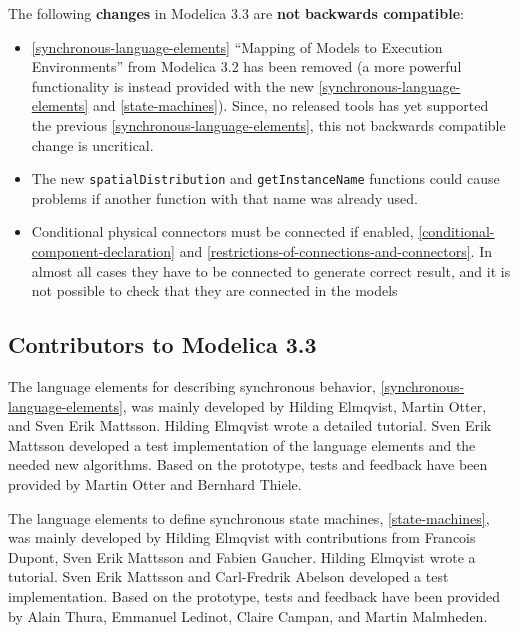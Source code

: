 The following \textbf{changes} in Modelica 3.3 are \textbf{not}
\textbf{backwards compatible}:

\begin{itemize}
\item
  \autoref{synchronous-language-elements} ``Mapping of Models to Execution Environments'' from
  Modelica 3.2 has been removed (a more powerful functionality is
  instead provided with the new \autoref{synchronous-language-elements} and \autoref{state-machines}). Since, no
  released tools has yet supported the previous \autoref{synchronous-language-elements}, this not
  backwards compatible change is uncritical.
\item
  The new \lstinline!spatialDistribution! and \lstinline!getInstanceName! functions could cause
  problems if another function with that name was already used.
\end{itemize}

\begin{itemize}
\item
  Conditional physical connectors must be connected if enabled,
  \autoref{conditional-component-declaration}
  and \autoref{restrictions-of-connections-and-connectors}. In almost all cases they have to be connected
  to generate correct result, and it is not possible to check that they
  are connected in the models
\end{itemize}

\subsection{Contributors to Modelica 3.3}

The language elements for describing synchronous behavior, \autoref{synchronous-language-elements},
was mainly developed by Hilding Elmqvist, Martin Otter, and Sven Erik
Mattsson. Hilding Elmqvist wrote a detailed tutorial. Sven Erik Mattsson
developed a test implementation of the language elements and the needed
new algorithms. Based on the prototype, tests and feedback have been
provided by Martin Otter and Bernhard Thiele.

The language elements to define synchronous state machines, \autoref{state-machines},
was mainly developed by Hilding Elmqvist with contributions from
Francois Dupont, Sven Erik Mattsson and Fabien Gaucher. Hilding Elmqvist
wrote a tutorial. Sven Erik Mattsson and Carl-Fredrik Abelson developed
a test implementation. Based on the prototype, tests and feedback have
been provided by Alain Thura, Emmanuel Ledinot, Claire Campan, and
Martin Malmheden.

